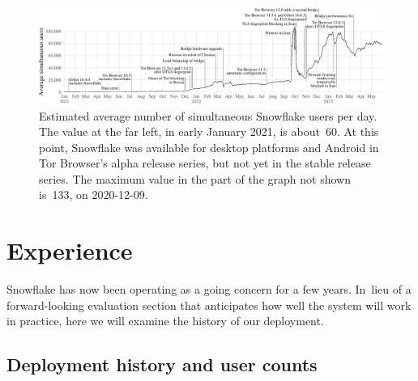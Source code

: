 \documentclass[letterpaper,twocolumn]{article}
\begin{document}
\begin{figure}[t]
\includegraphics{figures/users/users-global}
\caption{
Estimated average number of simultaneous Snowflake users per day.
The value at the far left,
in early January 2021, is about~60.
At this point, Snowflake was available
for desktop platforms and Android
in Tor Browser's alpha release series,
but not yet in the stable release series.
The maximum value in the part of the graph not shown
is~133, on \mbox{2020-12-09}.
}
\label{fig:user-counts}
\end{figure}

\section{Experience}
\label{sec:experience}

Snowflake has now been operating as a going concern for a few years.
In~lieu of a forward-looking evaluation section
that anticipates how well the system will work in practice,
here we will examine the history of our deployment.

\subsection{Deployment history and user counts}
\label{sec:deployment}
\end{document}
